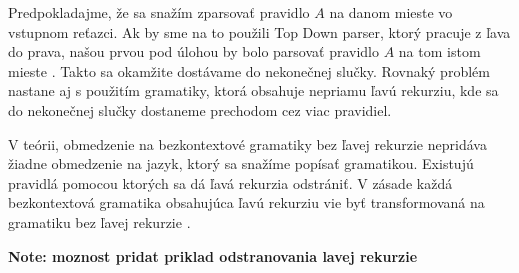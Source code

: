 Predpokladajme, že sa snažím zparsovať pravidlo $A$ na danom mieste vo vstupnom reťazci. Ak by sme na to použili Top Down parser, ktorý pracuje z ľava do prava, našou prvou pod úlohou by bolo parsovať pravidlo $A$ na tom istom mieste \cite{moore2000removing}. Takto sa okamžite dostávame do nekonečnej slučky. Rovnaký problém nastane aj s použitím gramatiky, ktorá obsahuje nepriamu ľavú rekurziu, kde sa do nekonečnej slučky dostaneme prechodom cez viac pravidiel.

V teórii, obmedzenie na bezkontextové gramatiky bez ľavej rekurzie nepridáva žiadne obmedzenie na jazyk, ktorý sa snažíme popísať gramatikou. Existujú pravidlá pomocou ktorých sa dá ľavá rekurzia odstrániť. V zásade každá bezkontextová gramatika obsahujúca ľavú rekurziu vie byť transformovaná na gramatiku bez ľavej rekurzie \cite{moore2000removing}.

\textbf{Note: moznost pridat priklad odstranovania lavej rekurzie}
